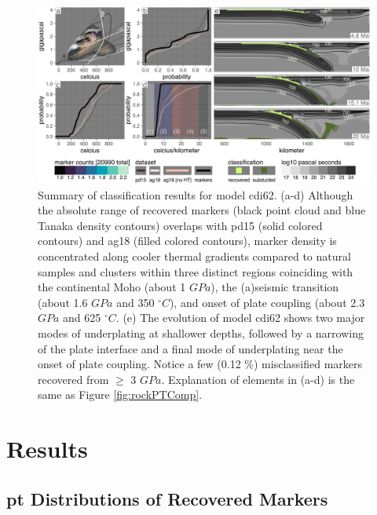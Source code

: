 \begin{landscape}


\begin{figure}[htbp]

{\centering \includegraphics[width=1\linewidth,]{assets/figs/chpt4/cdi62_bigComp} 

}

\caption[Summary of classification results for model cdi62]{Summary of classification results for model cdi62. (a-d) Although the absolute range of recovered markers (black point cloud and blue Tanaka density contours) overlaps with pd15 (solid colored contours) and ag18 (filled colored contours), marker density is concentrated along cooler thermal gradients compared to natural samples and clusters within three distinct regions coinciding with the continental Moho (about 1 \(GPa\)), the (a)seismic transition (about 1.6 \(GPa\) and 350 \(^\circ C\)), and onset of plate coupling (about 2.3 \(GPa\) and 625 \(^\circ C\). (e) The evolution of model cdi62 shows two major modes of underplating at shallower depths, followed by a narrowing of the plate interface and a final mode of underplating near the onset of plate coupling. Notice a few (0.12 \%) misclassified markers recovered from \(\geq\) 3 \(GPa\). Explanation of elements in (a-d) is the same as Figure \ref{fig:rockPTComp}.}\label{fig:bigComp}
\end{figure}


\end{landscape}

\hypertarget{chpt4Results}{%
\section{Results}\label{chpt4Results}}

\hypertarget{distributions-of-recovered-markers}{%
\subsection{\texorpdfstring{\gls{pt} Distributions of Recovered Markers}{ Distributions of Recovered Markers}}\label{distributions-of-recovered-markers}}

